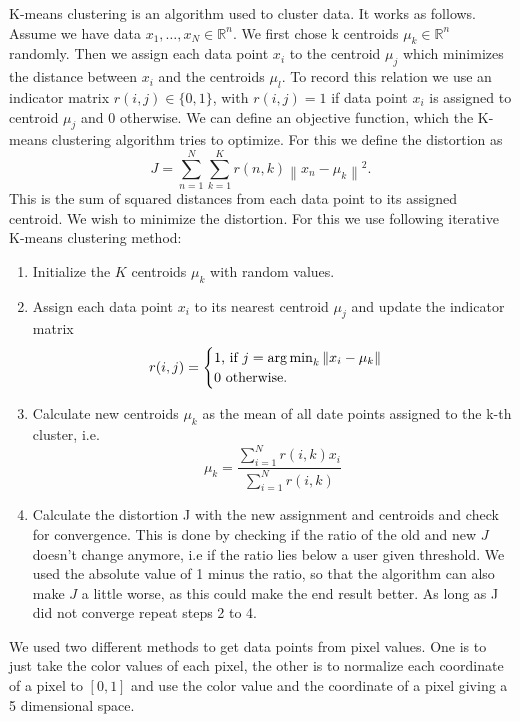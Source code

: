 K-means clustering is an algorithm used to cluster data. It works as follows. Assume we have data $x_1,\ldots,x_N \in \mathbb{R}^n$. We first chose k centroids $\mu_k \in \mathbb{R}^n$ randomly. Then we assign each data point $x_i$ to the centroid $\mu_j$ which minimizes the distance between $x_i$ and the centroids $\mu_l$. To record this relation we use an indicator matrix $r(i,j) \in \{0,1\}$, with $r(i,j)=1$ if data point $x_i$ is assigned to centroid $\mu_j$ and $0$ otherwise. We can define an objective function, which the K-means clustering algorithm tries to optimize. For this we define the distortion as
\begin{equation}
	J = \sum_{n=1}^{N} \sum_{k=1}^{K} r(n,k) \left\|x_n-\mu_k\right\|^2.
\end{equation}
This is the sum of squared distances from each data point to its assigned centroid. We wish to minimize the distortion. For this we use following iterative K-means clustering method:
\begin{enumerate}
\item Initialize the $K$ centroids $\mu_k$ with random values.
\item Assign each data point $x_i$ to its nearest centroid $\mu_j$ and update the indicator matrix
\[
	r(i,j)= \begin{cases}
               1 \text{, if } j = \operatorname*{arg\,min}_k\left\|x_i-\mu_k\right\| \\

             0 \text{ otherwise.}
            \end{cases}
\]
\item Calculate new centroids $\mu_k$ as the mean of all date points assigned to the k-th cluster, i.e. 
\[
	\mu_k = \frac{\sum\limits_{i=1}^N r(i,k) x_i}{\sum\limits_{i=1}^N r(i,k)}
\]
\item Calculate the distortion J with the new assignment and centroids and check for convergence. This is done by checking if the ratio of the old and new $J$ doesn't change anymore, i.e if the ratio lies below a user given threshold. We used the absolute value of 1 minus the ratio, so that the algorithm can also make $J$ a little worse, as this could make the end result better. As long as J did not converge repeat steps 2 to 4.
\end{enumerate} 

We used two different methods to get data points from pixel values. One is to just take the color values of each pixel, the other is to normalize each coordinate of a pixel to $[0, 1]$ and use the color value and the coordinate of a pixel giving a 5 dimensional space.

